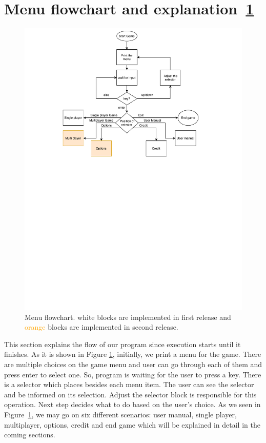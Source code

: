 \section{Menu flowchart and explanation~\ref{fig:menu}}
\begin{figure}
    \centering 
    \includegraphics[width=0.8\columnwidth]{menu.pdf}
    \caption{Menu flowchart. white blocks are implemented in first release and \textcolor{orange}{orange} blocks are implemented in second release. }
    \label{fig:menu}
\end{figure}

This section explains the flow of our program since execution starts until it finishes. 
As it is shown in Figure \ref{fig:menu}, initially, we print a menu for the game. There are multiple choices on the game menu and user can go through each of them and press enter to select one. So, program is waiting for the user to press a key.
There is a selector which places besides each menu item. The user can see the selector and be informed on its selection. Adjust the selector block is responsible for this operation.
Next step decides what to do based on the user's choice. 
As we seen in Figure~\ref{fig:menu}, we may go on six different scenarios: user manual, single player, multiplayer, options, credit and end game which will be explained in detail in the coming sections.

